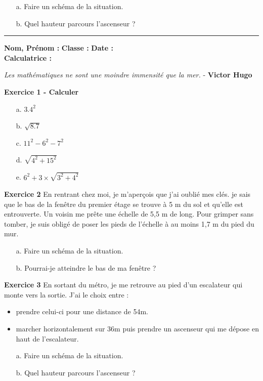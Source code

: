 \documentclass[12pt]{article}
\newcommand{\horrule}[1]{\rule{\linewidth}{#1}}
\begin{document}
\begin{enumerate}
\item[a.] Faire un schéma de la situation.
\item[b.] Quel hauteur parcours l'ascenseur ?
\end{enumerate}

\vspace{1cm}
\horrule{1px}
\vspace{1cm}

\textbf{Nom, Prénom :} \hspace{8cm} \textbf{Classe :} \hspace{3cm} \textbf{Date :}\\
\textbf{Calculatrice :}

\begin{center}
\textit{Les mathématiques ne sont une moindre immensité que la mer.} - \textbf{Victor Hugo}
\end{center}



\begin{multicols}{2}
\textbf{Exercice 1 - Calculer}

\begin{enumerate}
\item[a.] $3.4^2$
\item[b.] $\sqrt{8.7}$
\item[c.] $11^2 - 6^2 - 7^2$
\item[d.] $\sqrt{4^2 + 15^2}$
\item[e.] $6^2 + 3 \times \sqrt{3^2 + 4^2}$
\end{enumerate}
\end{multicols}



\textbf{Exercice 2} 
En rentrant chez moi, je m'aperçois que j'ai oublié mes clés. je sais que le bas de la fenêtre du premier étage se trouve à 5 m du sol et qu'elle est entrouverte. Un voisin me prête une échelle de 5,5 m de long. Pour grimper sans tomber, je suis obligé de poser les pieds de l'échelle à au moins 1,7 m du pied du mur. 

\begin{enumerate}
\item[a.] Faire un schéma de la situation. 
\item[b.] Pourrai-je atteindre le bas de ma fenêtre ?
\end{enumerate}


\textbf{Exercice 3} 
En sortant du métro, je me retrouve au pied d'un escalateur qui monte vers la sortie. J'ai le choix entre : 
\begin{itemize}
\item prendre celui-ci pour une distance de 54m.
\item marcher horizontalement sur 36m puis prendre un ascenseur qui me dépose en haut de l'escalateur.
\end{itemize} 

\begin{enumerate}
\item[a.] Faire un schéma de la situation.
\item[b.] Quel hauteur parcours l'ascenseur ?
\end{enumerate}
\end{document}
